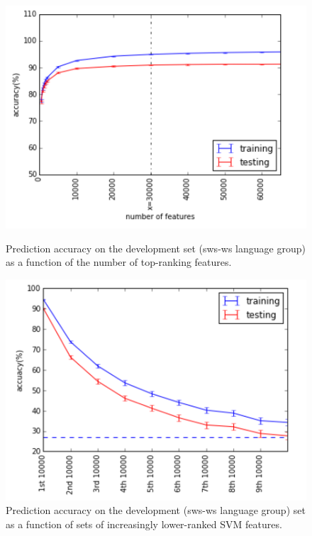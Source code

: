 \documentclass{article}
\begin{document}
\begin{figure}[h!]
\centering
\begin{minipage}{0.45\textwidth}
\centering
\includegraphics[scale = 0.45]{num_features_vs_accuracy.png}
\caption{Prediction accuracy on the development set (sws-ws language group)  as a function of the number of top-ranking features.}
\label{fig:TopFeatures}
\end{minipage}
\hfill
\begin{minipage}{0.45\textwidth}
\centering
\includegraphics[scale = 0.45]{accuracy_vs_feature_sets.png}
\caption{Prediction accuracy on the development (sws-ws language group)  set as a function of sets of increasingly lower-ranked SVM features.}
\label{fig:FeatureSets}
\end{minipage}


\end{figure}
\end{document}
